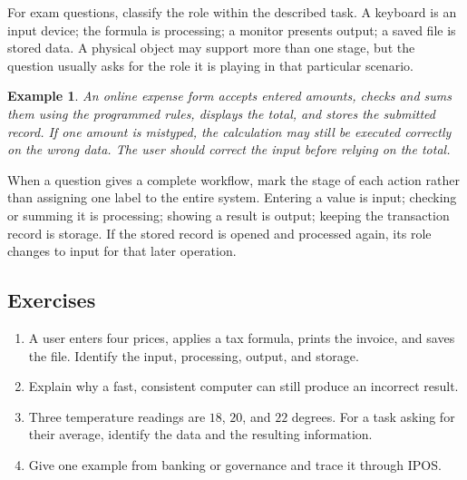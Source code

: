\documentclass[11pt]{article}
\newtheorem{example}{Example}[section]
\begin{document}
For exam questions, classify the role within the described task. A keyboard
is an input device; the formula is processing; a monitor presents output; a
saved file is stored data. A physical object may support more than one
stage, but the question usually asks for the role it is playing in that
particular scenario.

\begin{example}
An online expense form accepts entered amounts, checks and sums them using
the programmed rules, displays the total, and stores the submitted record.
If one amount is mistyped, the calculation may still be executed correctly
on the wrong data. The user should correct the input before relying on the
total.
\end{example}

When a question gives a complete workflow, mark the stage of each action
rather than assigning one label to the entire system. Entering a value is
input; checking or summing it is processing; showing a result is output;
keeping the transaction record is storage. If the stored record is opened
and processed again, its role changes to input for that later operation.

\subsection*{Exercises}
\begin{enumerate}[label=\arabic*.]
  \item A user enters four prices, applies a tax formula, prints the invoice,
    and saves the file. Identify the input, processing, output, and storage.
  \item Explain why a fast, consistent computer can still produce an
    incorrect result.
  \item Three temperature readings are $18$, $20$, and $22$ degrees. For a
    task asking for their average, identify the data and the resulting
    information.
  \item Give one example from banking or governance and trace it through
    IPOS.
\end{enumerate}
\end{document}
